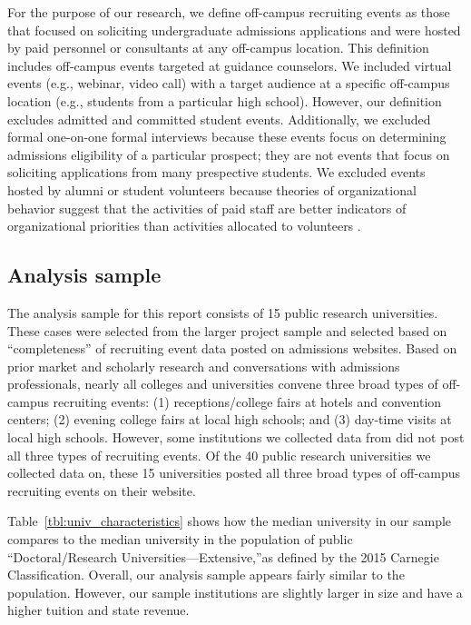 \documentclass[twoside]{article}
\begin{document}
For the purpose of our research, we define off-campus recruiting events as those that focused on soliciting undergraduate admissions applications and were hosted by paid personnel or consultants at any off-campus location.  This definition includes off-campus events targeted at guidance counselors. We included virtual events (e.g., webinar, video call) with a target audience at a specific off-campus location (e.g., students from a particular high school).  However, our definition excludes admitted and committed student events. Additionally, we excluded formal one-on-one formal interviews because these events focus on determining admissions eligibility of a particular prospect; they are not events that focus on soliciting applications from many prespective students. We excluded events hosted by alumni or student volunteers because theories of organizational behavior suggest that the activities of paid staff are better indicators of organizational priorities than activities allocated to volunteers \citep{RN531}.

\subsection*{Analysis sample}

The analysis sample for this report consists of 15 public research universities. These cases were selected from the larger project sample and selected based on ``completeness'' of recruiting event data posted on admissions websites.  Based on prior market and scholarly research  \citep[e.g., ][]{RN3519,RN4324,RN4314,RN4402} and conversations with admissions professionals, nearly all colleges and universities convene three broad types of off-campus recruiting events: (1) receptions/college fairs at hotels and convention centers; (2) evening college fairs at local high schools; and (3) day-time visits at local high schools. However, some institutions we collected data from did not post all three types of recruiting events. Of the 40 public research universities we collected data on, these 15 universities posted all three broad types of off-campus recruiting events on their website.

Table~\ref{tbl:univ_characteristics} shows how the median university in our sample compares to the median university in the population of public ``Doctoral/Research Universities—Extensive,''as defined by the 2015 Carnegie Classification. Overall, our analysis sample appears fairly similar to the population. However, our sample institutions are slightly larger in size and have a higher tuition and state revenue.
\end{document}
